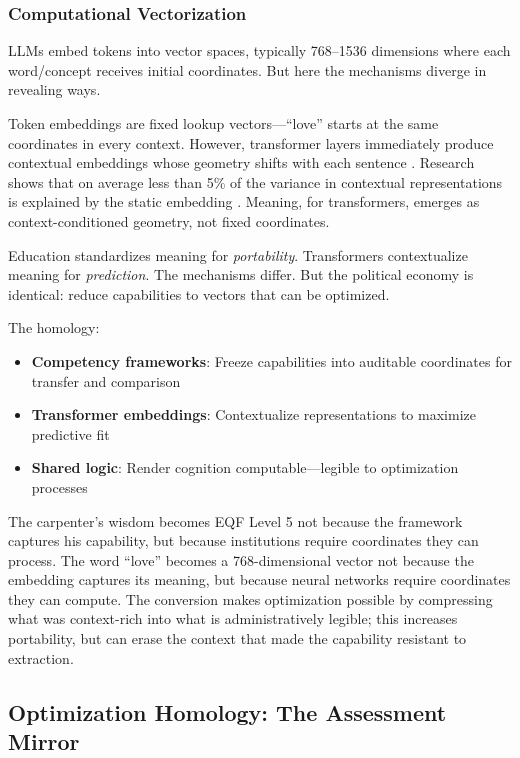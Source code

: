 \subsubsection{Computational Vectorization}

LLMs embed tokens into vector spaces, typically 768--1536 dimensions where each word/concept receives initial coordinates. But here the mechanisms diverge in revealing ways.

Token embeddings are fixed lookup vectors---``love'' starts at the same coordinates in every context. However, transformer layers immediately produce contextual embeddings whose geometry shifts with each sentence \citep{ethayarajh2019}. Research shows that on average less than 5\% of the variance in contextual representations is explained by the static embedding \citep{voita2019}. Meaning, for transformers, emerges as context-conditioned geometry, not fixed coordinates.

Education standardizes meaning for \textit{portability}. Transformers contextualize meaning for \textit{prediction}. The mechanisms differ. But the political economy is identical: reduce capabilities to vectors that can be optimized.

The homology:
\begin{itemize}
\item \textbf{Competency frameworks}: Freeze capabilities into auditable coordinates for transfer and comparison
\item \textbf{Transformer embeddings}: Contextualize representations to maximize predictive fit
\item \textbf{Shared logic}: Render cognition computable---legible to optimization processes
\end{itemize}

The carpenter's wisdom becomes EQF Level 5 not because the framework captures his capability, but because institutions require coordinates they can process. The word ``love'' becomes a 768-dimensional vector not because the embedding captures its meaning, but because neural networks require coordinates they can compute. The conversion makes optimization possible by compressing what was context-rich into what is administratively legible; this increases portability, but can erase the context that made the capability resistant to extraction.

\subsection{Optimization Homology: The Assessment Mirror}

